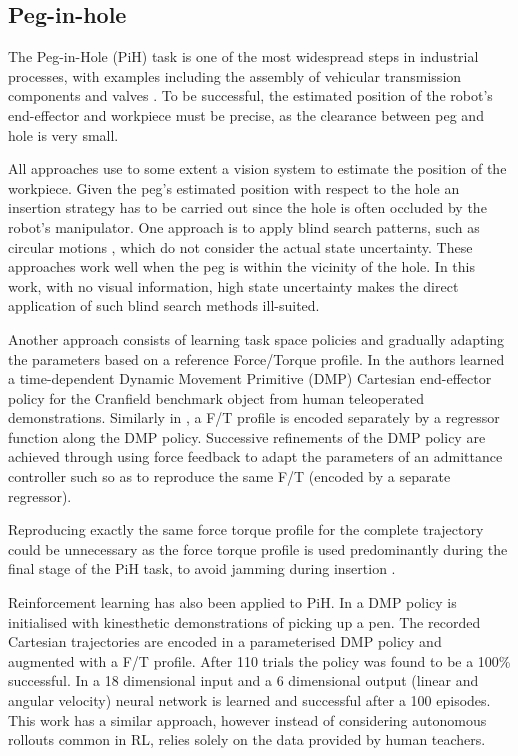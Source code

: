 \documentclass[final,5p,times,twocolumn]{elsarticle}
\begin{document}
\subsection{Peg-in-hole}

The Peg-in-Hole (PiH) task is one of the most widespread steps in industrial processes, 
with examples including the assembly of vehicular transmission components \cite{search_strategies_icra_2001} and 
valves \cite{online_gpr_icra_2014}. To be successful, the estimated position of the robot's end-effector 
and workpiece must be precise, as the clearance between peg and hole is very small.

All approaches use to some extent a vision system \cite{peg_personal_icra_2010} to estimate 
the position of the workpiece. Given  the peg's estimated position with respect to the hole 
an insertion strategy has to be carried out since the hole is often occluded by 
the robot's manipulator. One approach is to apply blind search patterns, such as circular 
motions \cite{search_strategies_icra_2001}, which do not consider the actual state uncertainty. 
These approaches work well when the peg is within the vicinity of the hole. In this work, with 
no visual information, high state uncertainty makes the direct application of such blind 
search methods ill-suited.

Another approach consists of learning task space policies and gradually adapting the parameters based on a reference
Force/Torque profile. In \cite{fast_peg_pbd_icmc_2014} the authors learned a time-dependent Dynamic Movement 
Primitive (DMP) \cite{Schaal04learningmovement} Cartesian end-effector policy for the Cranfield benchmark 
object from human teleoperated demonstrations. Similarly in \cite{trans_workpiece_icra_2013,sol_pdg_pbd_2014}, 
a F/T profile is encoded separately by a regressor function along the DMP policy. Successive refinements of 
the DMP policy are achieved through using force feedback to adapt the parameters of an admittance controller such 
so as to reproduce the same F/T (encoded by a separate regressor).

Reproducing exactly the same force torque profile for the complete trajectory could be 
unnecessary as the force torque profile is used predominantly during the final stage of the PiH task, 
to avoid jamming during insertion \cite[Chap. 5]{Kronander2015}. 

Reinforcement learning has also been applied to PiH. In \cite{learn_force_c_icirs_2011} a DMP policy is 
initialised with kinesthetic demonstrations of picking up a pen. The recorded Cartesian 
trajectories are encoded in a parameterised DMP policy and augmented with a F/T profile. 
After 110 trials the policy was found to be a 100\% successful. In \cite{learn_admittance_icra_1994} a 18 dimensional input 
and a 6 dimensional output (linear and angular velocity) neural network is learned and successful after a 100 episodes. 
This work has a similar approach, however instead of considering autonomous rollouts common in RL, 
relies solely on the data provided by human teachers.
\end{document}
